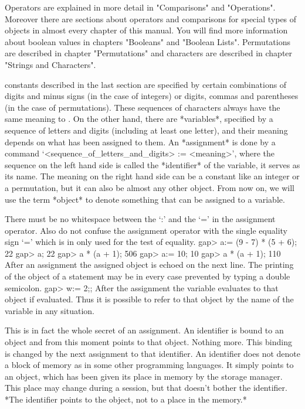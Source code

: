 Operators are explained in more detail in "Comparisons" and "Operations".
Moreover there are  sections about operators  and comparisons for special
types  of  objects in almost every chapter of this manual.  You will find
more information about boolean values in chapters "Booleans" and "Boolean
Lists".   Permutations  are   described  in  chapter  "Permutations"  and
characters are described in chapter "Strings and Characters".

\null

constants described   in  the  last  section   are  specified by  certain
combinations   of digits and minus   signs (in the   case of integers) or
digits,  commas  and parentheses (in  the case  of  permutations).  These
sequences of characters  always have the same meaning  to  {\GAP}. On the
other hand, there are *variables*, specified by a sequence of letters and
digits (including at least one letter), and their meaning depends on what
has been assigned to  them.  An *assignment* is  done by a {\GAP} command
`<sequence_of_letters_and_digits> :=  <meaning>',  where the  sequence on
the left hand side is called the *identifier*  of the variable, it serves
as its name. The meaning on the right hand side can be a constant like an
integer or a  permutation,  but it can  also  be almost any  other {\GAP}
object. From now on,  we will use the term  *object* to denote  something
that can be assigned to a variable.

There must be no whitespace between the `:' and the `=' in the assignment
operator.  Also do not confuse  the  assignment operator with the  single
equality sign `=' which is in {\GAP} only used for the test of equality.
\beginexample
    gap> a:= (9 - 7) * (5 + 6);
    22
    gap> a;
    22
    gap> a * (a + 1);
    506
    gap> a:= 10;
    10
    gap> a * (a + 1);
    110 
\endexample
After an assignment the assigned object is echoed on the  next line.  The
printing of the  object of a statement may  be in every case prevented by
typing a double semicolon.
\beginexample
    gap> w:= 2;; 
\endexample
After the assignment the variable evaluates  to that object if evaluated.
Thus it is possible to  refer to that object by  the name of the variable
in any situation.

This is in fact the whole secret of an assignment. An identifier is bound
to an  object and from this moment  points to that object.  Nothing more.
This binding  is changed by the  next  assignment to that  identifier. An
identifier does not denote a block of memory as in some other programming
languages. It simply points to an object, which has  been given its place
in memory by the {\GAP} storage manager.   This place may change during a
{\GAP} session, but that doesn't  bother the identifier.  *The identifier
points to the object, not to a place in the memory.*


